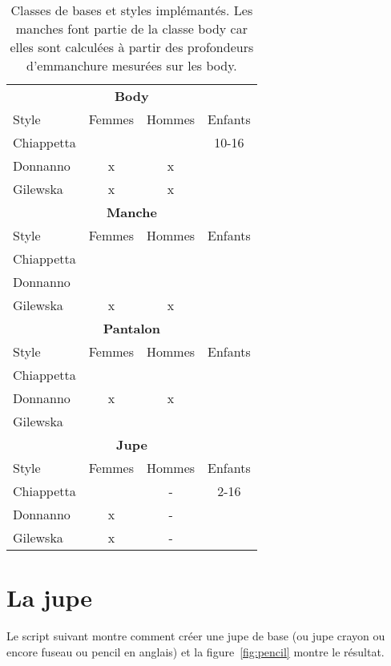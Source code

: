 \documentclass[10pt,a4paper,twoside]{report}
\begin{document}
\begin{table}[h]
\begin{center}
\begin{tabular}{lccc} \hline
\multicolumn{4}{c}{\textbf{Body}}\\
Style & Femmes & Hommes & Enfants \\ \hline
 Chiappetta & & & 10-16\\
 Donnanno & x & x &\\
 Gilewska & x & x &\\ \hline
 \multicolumn{4}{c}{\textbf{Manche}}\\
 Style & Femmes & Hommes & Enfants \\ \hline
  Chiappetta & & & \\
  Donnanno &  &  &\\
  Gilewska & x & x &\\ \hline
 \multicolumn{4}{c}{\textbf{Pantalon}}\\
 Style & Femmes & Hommes & Enfants \\ \hline
 Chiappetta & & & \\
 Donnanno & x & x &\\
 Gilewska & & &\\ \hline
 \multicolumn{4}{c}{\textbf{Jupe}}\\
 Style & Femmes & Hommes & Enfants \\ \hline
 Chiappetta & & - & 2-16 \\
 Donnanno & x &-  &\\
 Gilewska & x & -&\\ \hline
\end{tabular}
\end{center}
\label{tab:basic_classes}
\caption{Classes de bases et styles implémantés. Les manches font partie de la classe body car elles sont calculées à partir des profondeurs d'emmanchure mesurées sur les body.}
\end{table}



\section{La jupe}

Le script suivant montre comment créer une jupe de base (ou jupe crayon ou encore fuseau ou pencil en anglais) et la figure~\ref{fig:pencil} montre le résultat.
\end{document}
